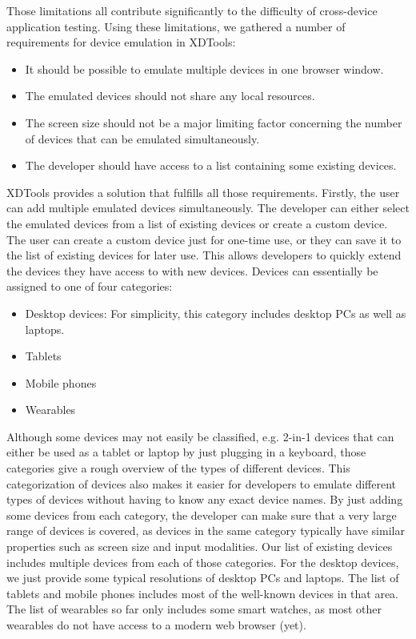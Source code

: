 Those limitations all contribute significantly to the difficulty of cross-device application testing. Using these limitations, we gathered a number of requirements for device emulation in XDTools:
\begin{itemize}
	\item It should be possible to emulate multiple devices in one browser window.
	\item The emulated devices should not share any local resources.
	\item The screen size should not be a major limiting factor concerning the number of devices that can be emulated simultaneously.
	\item The developer should have access to a list containing some existing devices.
\end{itemize}

XDTools provides a solution that fulfills all those requirements. Firstly, the user can add multiple emulated devices simultaneously. The developer can either select the emulated devices from a list of existing devices or create a custom device. The user can create a custom device just for one-time use, or they can save it to the list of existing devices for later use. This allows developers to quickly extend the devices they have access to with new devices. Devices can essentially be assigned to one of four categories:
\begin{itemize}
	\item Desktop devices: For simplicity, this category includes desktop PCs as well as laptops.
	\item Tablets
	\item Mobile phones
	\item Wearables
\end{itemize}
Although some devices may not easily be classified, e.g. 2-in-1 devices that can either be used as a tablet or laptop by just plugging in a keyboard, those categories give a rough overview of the types of different devices. This categorization of devices also makes it easier for developers to emulate different types of devices without having to know any exact device names. By just adding some devices from each category, the developer can make sure that a very large range of devices is covered, as devices in the same category typically have similar properties such as screen size and input modalities. Our list of existing devices includes multiple devices from each of those categories. For the desktop devices, we just provide some typical resolutions of desktop PCs and laptops. The list of tablets and mobile phones includes most of the well-known devices in that area. The list of wearables so far only includes some smart watches, as most other wearables do not have access to a modern web browser (yet).

